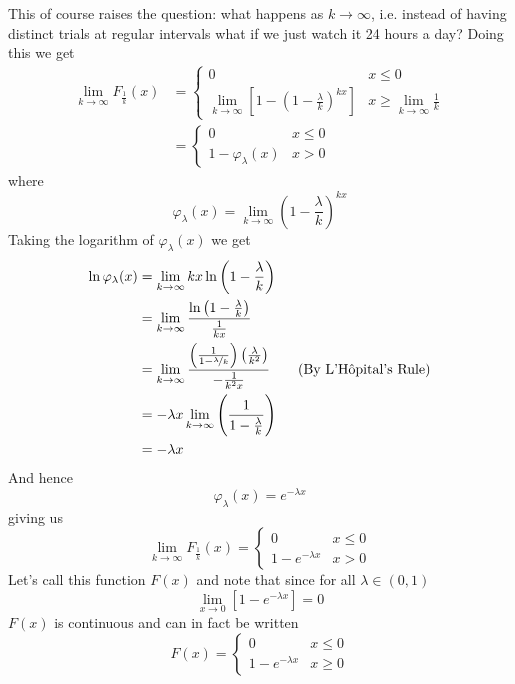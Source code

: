 \documentclass{report}
\begin{document}
This of course raises the question: what happens as $k\to\infty$, i.e. instead of having distinct trials at regular intervals what if we just watch it 24 hours a day? Doing this we get
\begin{align*}
    \lim_{k\to\infty} F_{\frac 1k}(x) 
    &= 
    \begin{cases}
        0 & x \le 0
        \\
        \displaystyle\lim_{k\to\infty}\left[1-\left(1-\frac \lambda k\right)^{kx}\right] & x\ge \displaystyle\lim_{k\to\infty}\tfrac 1k
    \end{cases}
    \\
    &= 
    \begin{cases}
        0 & x \le 0
        \\
        1-\varphi_\lambda(x) & x > 0
    \end{cases}
\end{align*}
where 
\[
    \varphi_\lambda(x) =\displaystyle\lim_{k\to\infty} \left(1-\frac \lambda k\right)^{kx}
\]
Taking the logarithm of $\varphi_\lambda(x)$ we get
\begin{align*}
    \ln\varphi_\lambda(x) & = \lim_{k\to\infty} kx\ln\left(1-\frac \lambda k\right)
    \\              & = \lim_{k\to\infty} \frac{\ln\left(1-\frac \lambda k\right)}{\frac 1 {kx}}
    \\              & = \lim_{k\to\infty} \frac{\left(\frac 1{1-\nicefrac \lambda k}\right)\left(\frac \lambda {k^2}\right)}{-\frac 1 {k^2 x}} \tag{By L'H${\hat{\textup o}}$pital's Rule}
    \\              & = -\lambda x\lim_{k\to\infty} \left(\frac 1 {1-\frac \lambda k}\right)
    \\              & = -\lambda x
\end{align*}
And hence
\[
    \varphi_\lambda(x)=e^{-\lambda x}
\]
giving us
\[
    \lim_{k\to\infty} F_{\frac 1k}(x) = 
    \begin{cases}
        0 & x \le 0
        \\
        1-e^{-\lambda x} & x > 0
    \end{cases}
\]
Let's call this function $F(x)$ and note that since for all $\lambda \in (0,1)$
\[
    \lim_{x\to 0} \left[1-e^{-\lambda x}\right]=0 
\]
$F(x)$ is continuous and can in fact be written
\[
    F(x) = 
    \begin{cases}
        0 & x \le 0
        \\
        1-e^{-\lambda x} & x \ge 0
    \end{cases}
\]
\end{document}
